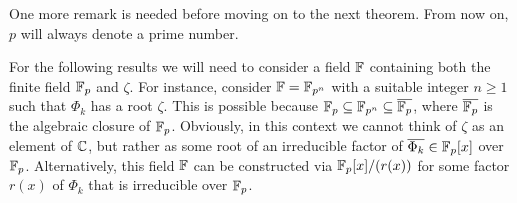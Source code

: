 \documentclass[../main.tex]{subfiles}
\begin{document}
One more remark is needed before moving on to the next theorem. From now on, $p$ will always denote a prime number.

\begin{remark}\label{rem:Ffield}
	For the following results we will need to consider a field $\mathbb{F}$ containing both the finite field $\mathbb{F}_p$ and $\zeta$. For instance, consider $\mathbb{F}=\mathbb{F}_{p^n}$ with a suitable integer $n\geqslant 1$ such that $\Phi_k$ has a root $\zeta$. This is possible because $\mathbb{F}_p\subseteq\mathbb{F}_{p^n}\subseteq\overline{\mathbb{F}_p}$, where $\overline{\mathbb{F}_p}$ is the algebraic closure of $\mathbb{F}_p$. Obviously, in this context we cannot think of $\zeta$ as an element of $\mathbb{C}$, but rather as some root of an irreducible factor of $\overline{\Phi_k}\in\mathbb{F}_p[x]$ over $\mathbb{F}_p$. Alternatively, this field $\mathbb{F}$ can be constructed via $\mathbb{F}_p[x]/(r(x))$ for some factor $r(x)$ of $\Phi_k$ that is irreducible over $\mathbb{F}_p$.
\end{remark}
\end{document}
